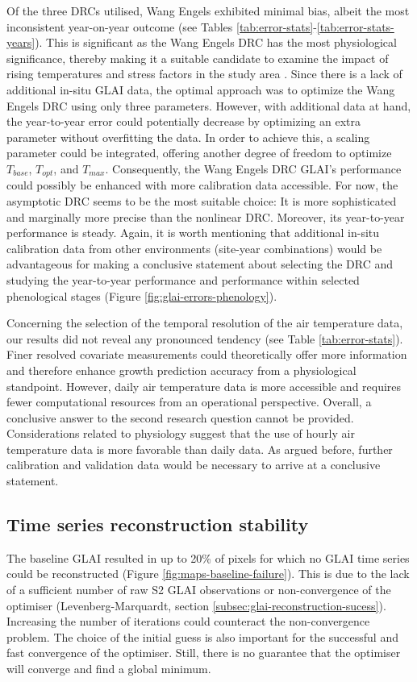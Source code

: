 Of the three \gls{DRC}s utilised, Wang Engels exhibited minimal bias, albeit the most inconsistent year-on-year outcome (see Tables \ref{tab:error-stats}-\ref{tab:error-stats-years}). This is significant as the Wang Engels \gls{DRC} has the most physiological significance, thereby making it a suitable candidate to examine the impact of rising temperatures and stress factors in the study area \citep{tschurr_climate_2020}. Since there is a lack of additional in-situ \gls{GLAI} data, the optimal approach was to optimize the Wang Engels \gls{DRC} using only three parameters. However, with additional data at hand, the year-to-year error could potentially decrease by optimizing an extra parameter without overfitting the data. In order to achieve this, a scaling parameter could be integrated, offering another degree of freedom to optimize $T_{base}$, $T_{opt}$, and $T_{max}$. Consequently, the Wang Engels \gls{DRC} \gls{GLAI}'s performance could possibly be enhanced with more calibration data accessible. For now, the asymptotic \gls{DRC} seems to be the most suitable choice: It is more sophisticated and marginally more precise than the nonlinear \gls{DRC}. Moreover, its year-to-year performance is steady. Again, it is worth mentioning that additional in-situ calibration data from other environments (site-year combinations) would be advantageous for making a conclusive statement about selecting the \gls{DRC} and studying the year-to-year performance and performance within selected phenological stages (Figure \ref{fig:glai-errors-phenology}).

Concerning the selection of the temporal resolution of the air temperature data, our results did not reveal any pronounced tendency (see Table \ref{tab:error-stats}). Finer resolved covariate measurements could theoretically offer more information and therefore enhance growth prediction accuracy from a physiological standpoint. However, daily air temperature data is more accessible and requires fewer computational resources from an operational perspective. Overall, a conclusive answer to the second research question cannot be provided. Considerations related to physiology suggest that the use of hourly air temperature data is more favorable than daily data. As argued before, further calibration and validation data would be necessary to arrive at a conclusive statement.

\subsection{Time series reconstruction stability}
The baseline \gls{GLAI} resulted in up to 20\% of pixels for which no \gls{GLAI} time series could be reconstructed (Figure \ref{fig:maps-baseline-failure}). This is due to the lack of a sufficient number of raw \gls{S2} \gls{GLAI} observations or non-convergence of the optimiser (Levenberg-Marquardt, section \ref{subsec:glai-reconstruction-sucess}). Increasing the number of iterations could counteract the non-convergence problem. The choice of the initial guess is also important for the successful and fast convergence of the optimiser. Still, there is no guarantee that the optimiser will converge and find a global minimum.


